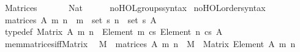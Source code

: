 %
\begin{isabellebody}%
%
%
\isadelimdocument
%
\endisadelimdocument
%
\isatagdocument
%
\isamarkuptrue%
%
\endisatagdocument
{\isafolddocument}%
%
\isadelimdocument
%
\endisadelimdocument
%
\isadelimtheory
%
\endisadelimtheory
%
\isatagtheory
{}\isamarkupfalse%
\ Matrices\isanewline
\ \ \isanewline
\ \ \ \ Nat\isanewline
\ \ \ \ \isanewline
{}%
\endisatagtheory
{\isafoldtheory}%
%
\isadelimtheory
\isanewline
%
\endisadelimtheory
\isanewline
{}\isamarkupfalse%
\ no{\isacharunderscore}{\kern0pt}HOL{\isacharunderscore}{\kern0pt}groups{\isacharunderscore}{\kern0pt}syntax\isanewline
{}\isamarkupfalse%
\ no{\isacharunderscore}{\kern0pt}HOL{\isacharunderscore}{\kern0pt}order{\isacharunderscore}{\kern0pt}syntax\isanewline
\isanewline
{}\isamarkupfalse%
\ {\isachardoublequoteopen}matrices\ A\ m\ n\ {\isasymequiv}\ {\isacharparenleft}{\kern0pt}{\isacharbrackleft}{\kern0pt}{}{\isacharcomma}{\kern0pt}{\isasymdots}{\isacharcomma}{\kern0pt}m{\isacharbrackleft}{\kern0pt}\ {\isacharcolon}{\kern0pt}{\isacharcolon}{\kern0pt}\ set{\isacharparenright}{\kern0pt}\ {\isasymrightarrow}s\ {\isacharparenleft}{\kern0pt}{\isacharbrackleft}{\kern0pt}{}{\isacharcomma}{\kern0pt}{\isasymdots}{\isacharcomma}{\kern0pt}n{\isacharbrackleft}{\kern0pt}\ {\isacharcolon}{\kern0pt}{\isacharcolon}{\kern0pt}\ set{\isacharparenright}{\kern0pt}\ {\isasymrightarrow}s\ A{\isachardoublequoteclose}\isanewline
\isanewline
{}\isamarkupfalse%
\ {\isacharbrackleft}{\kern0pt}typedef{\isacharbrackright}{\kern0pt}{\isacharcolon}{\kern0pt}\ {\isachardoublequoteopen}Matrix\ A\ m\ n\ {\isasymequiv}\ Element\ {\isacharbrackleft}{\kern0pt}{}{\isacharcomma}{\kern0pt}{\isasymdots}{\isacharcomma}{\kern0pt}m{\isacharbrackleft}{\kern0pt}\ {\isasymrightarrow}cs\ Element\ {\isacharbrackleft}{\kern0pt}{}{\isacharcomma}{\kern0pt}{\isasymdots}{\isacharcomma}{\kern0pt}n{\isacharbrackleft}{\kern0pt}\ {\isasymrightarrow}cs\ A{\isachardoublequoteclose}\isanewline
\isanewline
{}\isamarkupfalse%
\ mem{\isacharunderscore}{\kern0pt}matrices{\isacharunderscore}{\kern0pt}iff{\isacharunderscore}{\kern0pt}Matrix{\isacharcolon}{\kern0pt}\isanewline
\ \ {\isachardoublequoteopen}M\ {\isasymin}\ matrices\ A\ m\ n\ {\isasymlongleftrightarrow}\ M\ {\isacharcolon}{\kern0pt}\ Matrix\ {\isacharparenleft}{\kern0pt}Element\ A{\isacharparenright}{\kern0pt}\ m\ n{\isachardoublequoteclose}\isanewline

\end{isabellebody}
